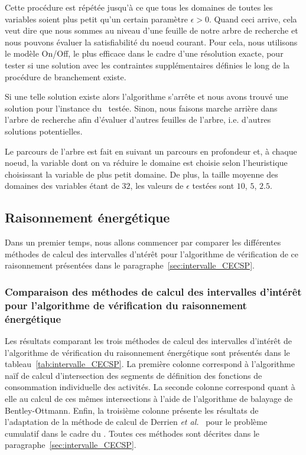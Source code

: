 Cette procédure est répétée jusqu'à ce que tous les domaines de toutes
les variables soient plus petit qu'un certain paramètre $\epsilon
>0$. Quand ceci arrive, cela veut dire que nous sommes au niveau d'une
feuille de notre arbre de recherche et nous pouvons évaluer la
satisfiabilité du noeud courant. Pour cela, nous utilisons le modèle
On/Off, le plus efficace dans le cadre d'une résolution exacte, pour
tester si une solution avec les contraintes supplémentaires définies
le long de la procédure de branchement existe.

Si une telle solution existe alors l'algorithme s'arrête et nous avons
trouvé une solution pour l'instance du \CECSP~testée. Sinon, nous
faisons marche arrière dans l'arbre de recherche afin d'évaluer
d'autres feuilles de l'arbre, i.e. d'autres solutions potentielles. 

Le parcours de l'arbre est fait en suivant un parcours en profondeur
et, à chaque noeud, la variable dont on va réduire le domaine est
choisie selon l'heuristique choisissant la variable de plus petit
domaine.  De plus, la taille moyenne des domaines des variables étant
de $32$, les valeurs de $\epsilon$ testées sont $10$, $5$, $2.5$.

\subsection{Raisonnement énergétique}
\label{sec:expe_RE}

Dans un premier temps, nous allons commencer par comparer les
différentes méthodes de calcul des intervalles d'ntérêt pour
l'algorithme de vérification de ce raisonnement présentées dans le
paragraphe~\ref{sec:intervalle_CECSP}. 

\subsubsection{Comparaison des méthodes de calcul des intervalles
  d'intérêt pour l'algorithme de vérification du raisonnement
  énergétique}

Les résultats comparant les trois méthodes de calcul des intervalles
d'intérêt de l'algorithme de vérification du raisonnement énergétique
sont présentés dans le tableau~\ref{tab:intervalle_CECSP}. La première
colonne correspond à l'algorithme naïf de calcul d'intersection des
segments de définition des fonctions de consommation individuelle des
activités. La seconde colonne correspond quant à elle au calcul de ces
mêmes intersections à l'aide de l'algorithme de balayage de
Bentley-Ottmann. Enfin, la troisième colonne présente les résultats de
l'adaptation de la méthode de calcul de Derrien {\it et al.}~\cite{DP}
pour le problème cumulatif dans le cadre du \CECSP. Toutes ces
méthodes sont décrites dans le
paragraphe~\ref{sec:intervalle_CECSP}.

